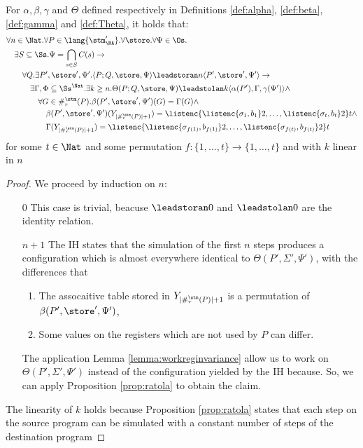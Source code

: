 \begin{lemma}
  \label{lemma:rantolan}
  For $\alpha, \beta, \gamma$ and $\Theta$ defined respectively in Definitions
  \ref{def:alpha}, \ref{def:beta}, \ref{def:gamma} and \ref{def:Theta}, it holds that:
  \begin{align*}
  &\forall n \in \Nat.\forall P \in \lang{\stm_\RA'}.\forall \store.\forall \Psi \in \Os.\\
  &\quad\exists S \subseteq \Ss. \Psi = \bigcap_{s \in S}C(s) \to\\
  &\quad\quad\forall Q.\exists P', \store', \Psi'.\langle P;Q, \store, \Psi\rangle \leadstoran n \langle P', \store', \Psi'\rangle \to\\
  &\quad\quad\quad\exists \Gamma, \Phi \subseteq \Ss^\Nat.\exists k\ge n.\Theta(P;Q, \store, \Psi) \leadstolan k \langle\alpha(P'), \Gamma, \gamma(\Psi')\rangle\land\\
  & \quad\quad\quad\quad \forall G \in \#_r^\stm(P).\beta(P', \store', \Psi')(G)=\Gamma(G) \land\\ & \quad\quad\quad\quad\quad\beta(P',\store', \Psi')(Y_{{|\#_r^\stm(P)|+1}})=\listenc{\listenc {\sigma_1, b_1} 2, \ldots, \listenc {\sigma_t, b_t} 2}t \land\\
  & \quad\quad\quad\quad\quad \Gamma(Y_{{|\#_r^\stm(P)|+1}})=\listenc{\listenc {\sigma_{f(1)}, b_{f(1)}} 2, \ldots, \listenc {\sigma_{f(t)}, b_{f(t)}} 2}t
  \end{align*}
  for some $t \in \Nat$ and some permutation $f:  \{1, \ldots, t\}\longrightarrow \{1, \ldots, t\}$
  and with $k$ linear in $n$
\end{lemma}
\begin{proof}
  We proceed by induction on $n$:
  \begin{itemize}
    \item [$0$] This case is trivial, beacuse $\leadstoran 0$ and $\leadstolan 0$
    are the identity relation.
    \item [$n+1$] The IH states that the simulation of the first
    $n$ steps produces a configuration which is almost everywhere identical to
    $\Theta (P', \Sigma', \Psi')$, with the differences that
    \begin{enumerate}
      \item The assocaitive table stored in $Y_{{|\#_r^\stm(P)|+1}}$ is a permutation
      of $\beta(P', \store', \Psi')$,
      \item Some values on the registers which are not used by $P$ can differ.
    \end{enumerate}
    The application Lemma \ref{lemma:workreginvariance} allow us to work on
    $\Theta (P', \Sigma', \Psi')$ instead of the
    configuration yielded by the IH because.
    So, we can apply Proposition \ref{prop:ratola} to obtain the claim.
  \end{itemize}
  The linearity of $k$ holds because Proposition \ref{prop:ratola}
  states that each step on the source program can be simulated with a
  constant number of steps of the destination program
\end{proof}

